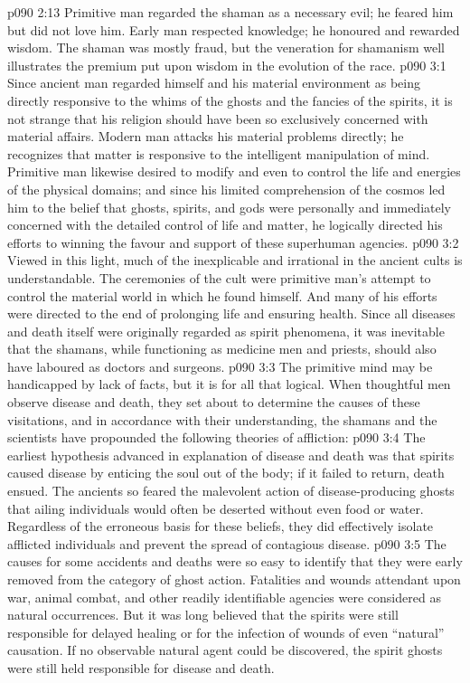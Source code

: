 \vs p090 2:13 Primitive man regarded the shaman as a necessary evil; he feared him but did not love him. Early man respected knowledge; he honoured and rewarded wisdom. The shaman was mostly fraud, but the veneration for shamanism well illustrates the premium put upon wisdom in the evolution of the race.
\vs p090 3:1 Since ancient man regarded himself and his material environment as being directly responsive to the whims of the ghosts and the fancies of the spirits, it is not strange that his religion should have been so exclusively concerned with material affairs. Modern man attacks his material problems directly; he recognizes that matter is responsive to the intelligent manipulation of mind. Primitive man likewise desired to modify and even to control the life and energies of the physical domains; and since his limited comprehension of the cosmos led him to the belief that ghosts, spirits, and gods were personally and immediately concerned with the detailed control of life and matter, he logically directed his efforts to winning the favour and support of these superhuman agencies.
\vs p090 3:2 Viewed in this light, much of the inexplicable and irrational in the ancient cults is understandable. The ceremonies of the cult were primitive man’s attempt to control the material world in which he found himself. And many of his efforts were directed to the end of prolonging life and ensuring health. Since all diseases and death itself were originally regarded as spirit phenomena, it was inevitable that the shamans, while functioning as medicine men and priests, should also have laboured as doctors and surgeons.
\vs p090 3:3 The primitive mind may be handicapped by lack of facts, but it is for all that logical. When thoughtful men observe disease and death, they set about to determine the causes of these visitations, and in accordance with their understanding, the shamans and the scientists have propounded the following theories of affliction:
\vs p090 3:4 \bibnobreakspace {} The earliest hypothesis advanced in explanation of disease and death was that spirits caused disease by enticing the soul out of the body; if it failed to return, death ensued. The ancients so feared the malevolent action of disease\hyp{}producing ghosts that ailing individuals would often be deserted without even food or water. Regardless of the erroneous basis for these beliefs, they did effectively isolate afflicted individuals and prevent the spread of contagious disease.
\vs p090 3:5 \bibnobreakspace {} The causes for some accidents and deaths were so easy to identify that they were early removed from the category of ghost action. Fatalities and wounds attendant upon war, animal combat, and other readily identifiable agencies were considered as natural occurrences. But it was long believed that the spirits were still responsible for delayed healing or for the infection of wounds of even “natural” causation. If no observable natural agent could be discovered, the spirit ghosts were still held responsible for disease and death.

